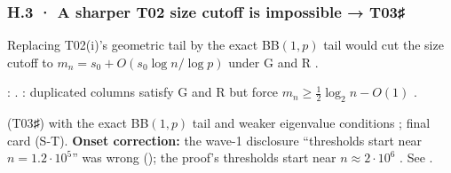 \subsubsection*{H.3 · A sharper T02 size cutoff is impossible → T03♯}
\begin{description}[leftmargin=1.3em,style=unboxed,font=\normalfont]
\item[\textbf{Claim.}] Replacing T02(i)'s geometric tail by the exact BB$(1,p)$ tail would cut the size cutoff to $m_n=s_0+O(s_0\log n/\log p)$ under G and R .
\item[\textbf{Failed.}] :  . : duplicated columns satisfy G and R but force $m_n\ge\tfrac12\log_2 n-O(1)$ .
\item[\textbf{Replacement.}]  (T03♯) with the exact BB$(1,p)$ tail and weaker eigenvalue conditions ; final card  (S-T). \textbf{Onset correction:} the wave-1 disclosure ``thresholds start near $n = 1.2\cdot10^5$'' was wrong (); the proof's thresholds start near $n\approx2\cdot10^6$ . See .
\end{description}


